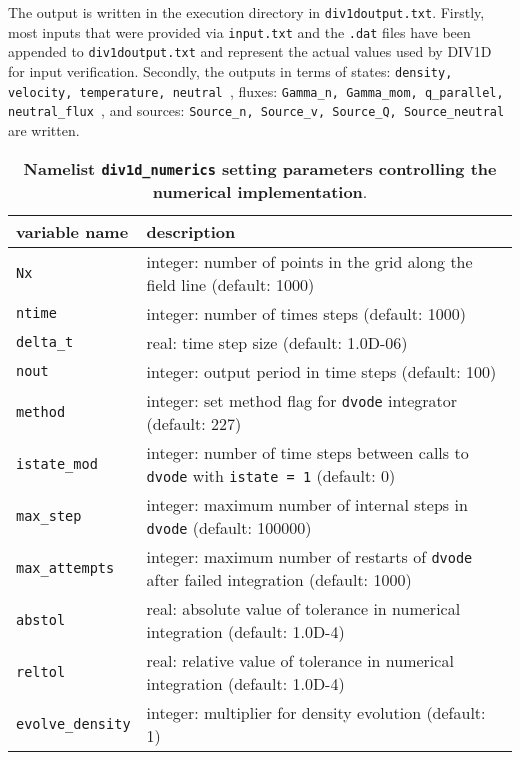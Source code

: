 \documentclass[amsmath,amssymb,a4]{revtex4-2}
\begin{document}
The output is written in the execution directory in {\tt div1doutput.txt}. Firstly, most inputs that were provided via {\tt input.txt} and the {\tt *.dat} files have been appended to {\tt div1doutput.txt} and represent the actual values used by DIV1D for input verification. Secondly, the outputs in terms of states: {\tt density, velocity, temperature, neutral }, fluxes: {\tt Gamma\_n, Gamma\_mom, q\_parallel, neutral\_flux }, and sources: {\tt Source\_n, Source\_v, Source\_Q, Source\_neutral} are written.

\begin{table}[h]
\begin{center}
  \caption{{\bf Namelist {\tt div1d\_numerics} setting parameters controlling the numerical implementation}.}
  \label{tab:input_numerics}
  \begin{tabular}{|| l  | l ||}
    \hline\hline
    variable name                & description \\ \hline\hline
    {\tt Nx}                     & integer: number of points in the grid along the field line (default: 1000) \\ \hline
    {\tt ntime}                  & integer: number of times steps (default: 1000)  \\ \hline
    {\tt delta\_t}               & real: time step size (default: 1.0D-06)  \\ \hline
    {\tt nout}                   & integer: output period in time steps (default: 100) \\ \hline
    {\tt method}                 & integer: set method flag for {\tt dvode} integrator (default: 227)   \\ \hline
	{\tt istate\_mod}            & integer: number of time steps between calls to {\tt dvode} with {\tt istate = 1} (default: 0) \\ \hline
	{\tt max\_step}              & integer: maximum number of internal steps in {\tt dvode} (default: 100000) \\ \hline
	{\tt max\_attempts}          & integer: maximum number of restarts of {\tt dvode} after failed integration (default: 1000) \\ \hline
    {\tt abstol}                 & real: absolute value of tolerance in numerical integration (default: 1.0D-4)  \\ \hline
    {\tt reltol}                 & real: relative value of tolerance in numerical integration (default: 1.0D-4)  \\ \hline
	{\tt evolve\_density}        & integer: multiplier for density evolution (default: 1) \\ \hline

\end{tabular}
\end{center}
\end{table}
\end{document}
